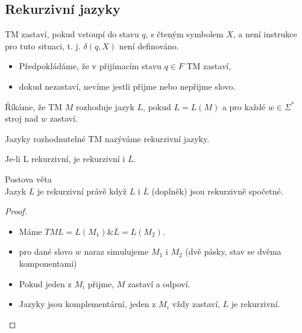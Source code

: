 \documentclass[../main.tex]{subfiles}
\begin{document}
\subsection{Rekurzivní jazyky}
\begin{definition}
    TM zastaví, pokud vstoupí do stavu $q$, s čteným symbolem $X$, a není instrukce pro tuto situaci, t. j. $\delta(q,X)$ není definováno.
\end{definition}
\begin{itemize}
    \item Předpokládáme, že v přijímacím stavu $q \in F$ TM zastaví,
    \item dokud nezastaví, nevíme jestli přijme nebo nepřijme slovo.
\end{itemize}
\begin{definition}
    Říkáme, že TM $M$ rozhoduje jazyk $L$, pokud $L = L(M)$ a pro každé $w \in \Sigma^*$ stroj nad $w$ zastaví.

    Jazyky rozhodnutelné TM nazýváme rekurzivní jazyky.
\end{definition}
\begin{theorem}
    Je-li L rekurzivní, je rekurzivní i $\overline{L}.$
\end{theorem}
\begin{theorem}
    Postova věta\\

    Jazyk $L$ je rekurzivní právě když $L$ i $\overline{L}$ (doplněk) jsou rekurzivně spočetné.
    \begin{proof}
        \begin{itemize}
            \item Máme $TM L = L(M_1) \& \overline{L} = L(M_2)$.
            \item pro dané slovo $w$ naraz simulujeme $M_1$ i $M_2$ (dvě pásky, stav se dvěma komponentami)
            \item Pokud jeden z $M_i$ přijme, $M$ zastaví a odpoví.
            \item Jazyky jsou komplementární, jeden z $M_i$ vždy zastaví, $L$ je rekurzivní.
        \end{itemize}
    \end{proof}
\end{theorem}
\end{document}

